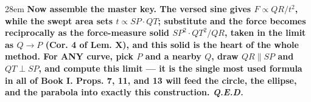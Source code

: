 \documentclass[border=4pt]{standalone}
\begin{document}
\begin{varwidth}{28em}
\large\bfseries
Now assemble the master key. The versed sine gives $F \propto QR/t^2$, while the swept area sets      $t \propto SP\cdot QT$; substitute and the force becomes reciprocally as the \textcolor{measpurple}{force-measure      solid $SP^2\cdot QT^2/QR$}, taken in the limit as $Q\to P$ (Cor. 4 of Lem. X), and this solid is the heart      of the whole method. For ANY curve, pick $P$ and a nearby $Q$, draw $QR\parallel SP$ and $QT\perp SP$, and      compute this limit — it is the single most used formula in all of Book I. Props. 7, 11, and 13 will feed      the circle, the ellipse, and the parabola into exactly this construction. \textit{Q.E.D.}
\end{varwidth}
\end{document}
